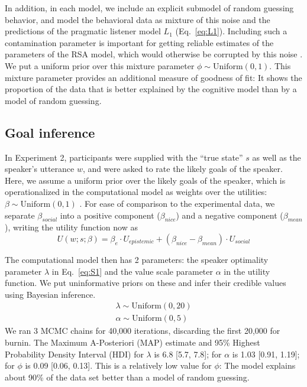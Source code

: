 \documentclass[10pt,letterpaper]{article}
\begin{document}
In addition, in each model, we include an explicit submodel of random guessing behavior, and model the behavioral data as mixture of this noise and the predictions of the pragmatic listener model $L_1$ (Eq.~\ref{eq:L1}).
Including such a contamination parameter is important for getting reliable estimates of the parameters of the RSA model, which would otherwise be corrupted by this noise \cite{LW2014}. 
We put a uniform prior over this mixture parameter $\phi \sim \text{Uniform}(0,1)$. 
This mixture parameter provides an additional measure of goodness of fit: It shows the proportion of the data that is better explained by the cognitive model than by a model of random guessing. 

\subsection{Goal inference}

In Experiment 2, participants were supplied with the ``true state'' $s$ as well as the speaker's utterance $w$, and were asked to rate the likely goals of the speaker. 
Here, we assume a uniform prior over the likely goals of the speaker, which is operationalized in the computational model as weights over the utilities: $\beta \sim \text{Uniform}(0,1)$ .
For ease of comparison to the experimental data, we separate $\beta_{social}$ into a positive component ($\beta_{nice}$) and a negative component ($\beta_{mean}$), writing the utility function now as
$$
U(w;s; \beta) = \beta_{e}\cdot U_{epistemic} + (\beta_{nice} - \beta_{mean}) \cdot U_{social}
$$

The computational model then has 2 parameters: the speaker optimality parameter $\lambda$ in Eq.~\ref{eq:S1} and the value scale parameter $\alpha$ in the utility function. 
We put uninformative priors on these and infer their credible values using Bayesian inference.
\begin{eqnarray}
\lambda \sim \text{Uniform}(0,20)\\
\alpha \sim \text{Uniform}(0, 5)
\end{eqnarray}
We ran 3 MCMC chains for 40,000 iterations, discarding the first 20,000 for burnin.
The Maximum A-Posteriori (MAP) estimate and 95\% Highest Probability Density Interval (HDI) for $\lambda$ is 6.8 [5.7, 7.8]; for $\alpha$ is 1.03 [0.91, 1.19]; for $\phi$ is 0.09 [0.06, 0.13].
This is a relatively low value for $\phi$: The model explains about 90\% of the data set better than a model of random guessing.











\setlength{\bibleftmargin}{.125in}
\setlength{\bibindent}{-\bibleftmargin}


\end{document}
